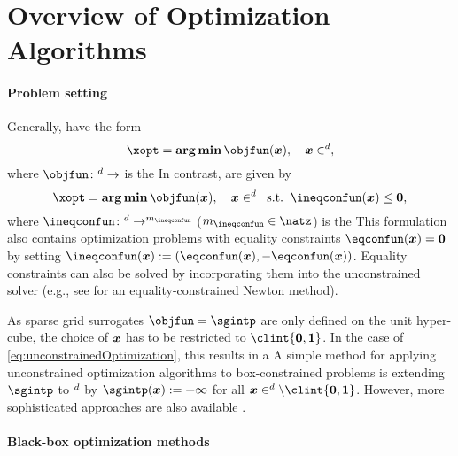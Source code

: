 \section{Overview of Optimization Algorithms}
\label{sec:51algorithms}

\paragraph{Problem setting}


Generally,  have the form
\begin{equation}
  \label{eq:unconstrainedOptimization}
  \xopt = \vecargmin \objfun(\*x),\quad
  \*x \in \real^d,
\end{equation}
where $\objfun\colon \real^d \to \real$ is the 
In contrast,  are given by
\begin{equation}
  \label{eq:constrainedOptimization}
  \xopt = \vecargmin \objfun(\*x),\quad
  \*x \in \real^d\;\;\text{s.t.}\;\;
  \ineqconfun(\*x) \le \*0,
\end{equation}
where
$\ineqconfun\colon \real^d \to \real^{m_{\ineqconfun}}$
($m_{\ineqconfun} \in \natz$)
is the 
This formulation also contains optimization problems
with equality constraints $\eqconfun(\*x) = \*0$
by setting $\ineqconfun(\*x) := (\eqconfun(\*x), -\eqconfun(\*x))$.
Equality constraints can also be solved by incorporating them
into the unconstrained solver (e.g., see \cite{Boyd04Convex}
for an equality-constrained Newton method).

As sparse grid surrogates $\objfun = \sgintp$ are only defined on the
unit hyper-cube,
the choice of ${\boldsymbol{x}}$ has to be restricted to $\clint{\*0, \*1}$.
In the case of \eqref{eq:unconstrainedOptimization},
this results in a 
A simple method for applying unconstrained optimization algorithms
to box-constrained problems is extending $\sgintp$ to $\real^d$ by
$\sgintp(\*x) := +\infty$ for all $\*x \in \real^d \setminus \clint{\*0, \*1}$.
However, more sophisticated
approaches are also available \cite{More87Optimization}.

\paragraph{Black-box optimization methods}

